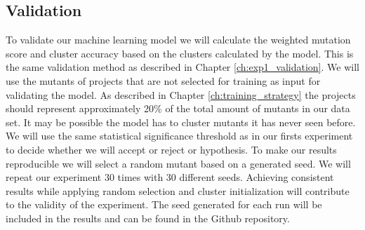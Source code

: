 \documentclass[../../main]{subfiles}
\begin{document}
\subsection{Validation}
To validate our machine learning model we will calculate the weighted mutation score and cluster accuracy based on the clusters calculated by the model.
This is the same validation method as described in Chapter \ref{ch:exp1_validation}.
We will use the mutants of projects that are not selected for training as input for validating the model.
As described in Chapter \ref{ch:training_strategy} the projects should represent approximately 20\% of the total amount of mutants in our data set.
It may be possible the model has to cluster mutants it has never seen before.
We will use the same statistical significance threshold as in our firsts experiment to decide whether we will accept or reject or hypothesis.
To make our results reproducible we will select a random mutant based on a generated seed.
We will repeat our experiment 30 times with 30 different seeds.
Achieving consistent results while applying random selection and cluster initialization will contribute to the validity of the experiment.
The seed generated for each run will be included in the results and can be found in the Github repository\cite{rbasarat-repo}.
\end{document}
